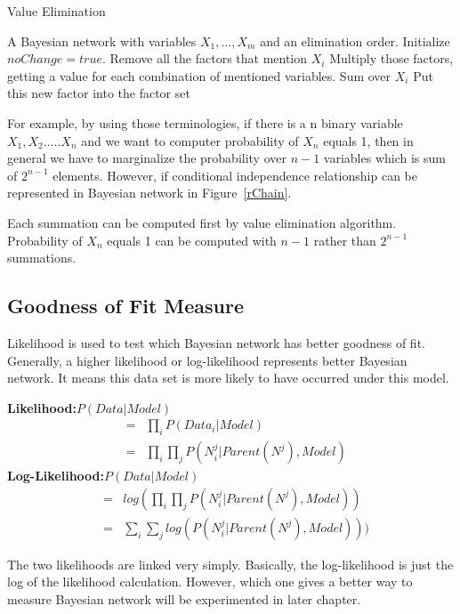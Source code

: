 \documentclass{article}
\begin{document}
\begin{algorithm}[tb]
   \caption{Value Elimination}
   \label{alg:value}
\begin{algorithmic}
    A Bayesian network with variables $X_1,...,X_m$ and an elimination order.
   \STATE Initialize $noChange = true$.
   \STATE Remove all the factors that mention $X_i$
   \STATE Multiply those factors, getting a value for each combination of mentioned variables.
   \STATE Sum over $X_i$
   \STATE Put this new factor into the factor set
   \ENDFOR
\end{algorithmic}
\end{algorithm}

For example, by using those terminologies, if there is a n binary variable $X_1, X_2.....X_n$ and we want to computer probability of $X_n$ equals 1, then in general we have to marginalize the probability over $n-1$ variables which is sum of $2^{n-1}$ elements. However, if conditional independence relationship can be represented in Bayesian network in Figure~\ref{rChain}.

Each summation can be computed first by value elimination algorithm. Probability of $X_n$ equals 1 can be computed with $n - 1$ rather than $2^{n-1}$ summations. 

\subsection{Goodness of Fit Measure}
Likelihood is used to test which Bayesian network has better goodness of fit. Generally, a higher likelihood or log-likelihood represents better Bayesian network. It means this data set is more likely to have occurred under this model.

\textbf{Likelihood:}$P(Data|Model)$
\begin{eqnarray}
&=& \prod_{i} P(Data_{i}|Model)\\
&=&\prod_{i}\prod_{j} P(N_{i}^{j}|Parent(N^{j}), Model)
\end{eqnarray}
\textbf{Log-Likelihood:}$P(Data|Model)$
\begin{eqnarray}
&=&log(\prod_{i}\prod_{j} P(N_{i}^{j}|Parent(N^{j}), Model))\\
&=&\sum_{i}\sum_{j}log(P(N_{i}^{j}|Parent(N^{j}), Model)))
\end{eqnarray}


The two likelihoods are linked very simply. Basically, the log-likelihood is just the log of the likelihood calculation.  However, which one gives a better way to measure Bayesian network will be experimented in later chapter.
\end{document}
